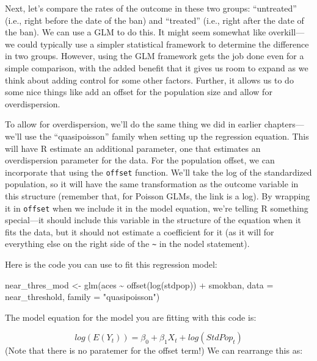 \documentclass[
]{book}
\newenvironment{Shaded}{\begin{snugshade}}{\end{snugshade}}
\newcommand{\AttributeTok}[1]{\textcolor[rgb]{0.77,0.63,0.00}{#1}}
\newcommand{\FunctionTok}[1]{\textcolor[rgb]{0.00,0.00,0.00}{#1}}
\newcommand{\NormalTok}[1]{#1}
\newcommand{\OtherTok}[1]{\textcolor[rgb]{0.56,0.35,0.01}{#1}}
\newcommand{\SpecialCharTok}[1]{\textcolor[rgb]{0.00,0.00,0.00}{#1}}
\newcommand{\StringTok}[1]{\textcolor[rgb]{0.31,0.60,0.02}{#1}}
\begin{document}
Next, let's compare the rates of the outcome in these two groups: ``untreated'' (i.e., right before the date of the ban) and ``treated'' (i.e., right after the date of the ban). We can use a GLM to do this. It might seem somewhat like overkill---we could typically use a simpler statistical framework to determine the difference in two groups. However, using the GLM framework gets the job done even for a simple comparison, with the added benefit that it gives us room to expand as we think about adding control for some other factors. Further, it allows us to do some nice things like add an offset for the population size and allow for overdispersion.

To allow for overdispersion, we'll do the same thing we did in earlier chapters---we'll use the ``quasipoisson'' family when setting up the regression equation. This will have R estimate an additional parameter, one that estimates an overdispersion parameter for the data. For the population offset, we can incorporate that using the \texttt{offset} function. We'll take the log of the standardized population, so it will have the same transformation as the outcome variable in this structure (remember that, for Poisson GLMs, the link is a log). By wrapping it in \texttt{offset} when we include it in the model equation, we're telling R something special---it should include this variable in the structure of the equation when it fits the data, but it should not estimate a coefficient for it (as it will for everything else on the right side of the \texttt{\textasciitilde{}} in the nodel statement).

Here is the code you can use to fit this regression model:

\begin{Shaded}
\begin{Highlighting}[]
\NormalTok{near\_thres\_mod }\OtherTok{\textless{}{-}} \FunctionTok{glm}\NormalTok{(aces }\SpecialCharTok{\textasciitilde{}} \FunctionTok{offset}\NormalTok{(}\FunctionTok{log}\NormalTok{(stdpop)) }\SpecialCharTok{+}\NormalTok{ smokban, }
                      \AttributeTok{data =}\NormalTok{ near\_threshold, }
                      \AttributeTok{family =} \StringTok{"quasipoisson"}\NormalTok{)}
\end{Highlighting}
\end{Shaded}

The model equation for the model you are fitting with this code is:

\[
log(E(Y_t)) = \beta_0 + \beta_1 X_t + log(StdPop_t)
\]
(Note that there is no paratemer for the offset term!) We can rearrange this as:
\end{document}
